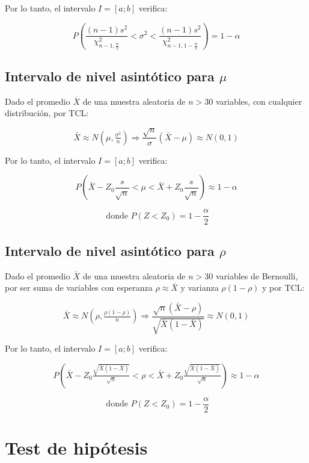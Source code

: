 \documentclass[a5paper,12pt,twoside]{book}
\begin{document}
Por lo tanto, el intervalo $I=[a;b]$ verifica:

\begin{equation}
P \left( \dfrac{(n-1)s^2}{\chi_{n-1,\tfrac{\alpha}{2}}^2} < \sigma^2 < \dfrac{(n-1)s^2}{\chi_{n-1,1-\tfrac{\alpha}{2}}^2} \right) = 1 - \alpha
\end{equation}

\subsection{Intervalo de nivel asintótico para $\mu$}

Dado el promedio $\bar{X}$ de una muestra aleatoria de $n>30$ variables, con cualquier distribución, por TCL:

$$ \bar{X} \approx N(\mu,\tfrac{\sigma^2}{n}) \Rightarrow \dfrac{\sqrt{n}}{\sigma} (\bar{X}-\mu) \approx N(0,1) $$

Por lo tanto, el intervalo $I=[a;b]$ verifica:

\begin{equation}
P \left( \bar{X} - Z_0 \dfrac{s}{\sqrt{n}} < \mu < \bar{X} + Z_0 \dfrac{s}{\sqrt{n}} \right) \approx 1 - \alpha
\end{equation}

$$ \text{ donde } P(Z<Z_0)=1-\dfrac{\alpha}{2} $$

\subsection{Intervalo de nivel asintótico para $\rho$}

Dado el promedio $\bar{X}$ de una muestra aleatoria de $n>30$ variables de Bernoulli, por ser suma de variables con esperanza $\rho \approx \bar{X}$ y varianza $\rho(1-\rho)$ y por TCL:

$$ \bar{X} \approx N(\rho,\tfrac{\rho(1-\rho)}{n}) \Rightarrow \dfrac{\sqrt{n}(\bar{X}-\rho)}{\sqrt{\bar{X}(1-\bar{X})}} \approx N(0,1) $$

Por lo tanto, el intervalo $I=[a;b]$ verifica:

\begin{equation}
P \left( \bar{X} - Z_0 \tfrac{\sqrt{\bar{X}(1-\bar{X})}}{\sqrt{n}} < \rho < \bar{X} + Z_0 \tfrac{\sqrt{\bar{X}(1-\bar{X})}}{\sqrt{n}} \right) \approx 1 - \alpha
\end{equation}

$$ \text{ donde } P(Z<Z_0)=1-\dfrac{\alpha}{2} $$

\section{Test de hipótesis}
\end{document}
